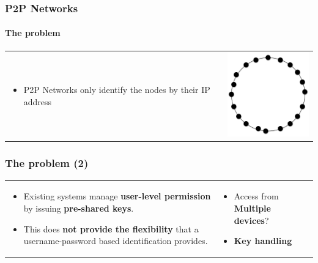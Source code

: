 \begin{frame}
\frametitle{P2P Networks}
\framesubtitle{The problem}
\begin{table}
\begin{tabular}{p{7cm}p{3cm}}
\begin{itemize}
  \item P2P Networks only identify the nodes by their IP address 
\end{itemize}
&
\vspace{1.5cm}
\includegraphics[width=4cm]{img/p2p-structured}\\
\end{tabular}
\end{table}
\end{frame}

\begin{frame}
\frametitle{The problem (2)}
\begin{table}
\begin{tabular}{p{7cm}p{3cm}}
\begin{itemize}
  \item Existing systems manage \textbf{user-level permission} by issuing \textbf{pre-shared keys}.
  \item This does \textbf{not provide the flexibility} that a username-password based identification provides.
\end{itemize}
&
\vspace{1.5cm}
\begin{itemize}
  \item Access from \textbf{Multiple devices}?
  \item \textbf{Key handling}
\end{itemize}
\end{tabular}
\end{table}
\end{frame}


